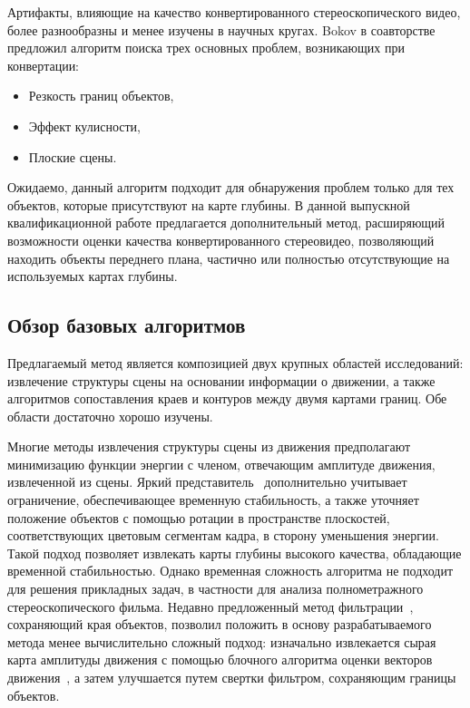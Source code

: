 \documentclass[14pt, a4paper]{extarticle}
\begin{document}
Артифакты, влияющие на качество конвертированного стереоскопического видео, более 
разнообразны и менее изучены в научных кругах. Bokov в соавторстве~\cite{bokov2014automatic} 
предложил алгоритм поиска трех основных проблем, возникающих при конвертации:
\begin{itemize}
	\item Резкость границ объектов,
	\item Эффект кулисности,
	\item Плоские сцены.
\end{itemize}
Ожидаемо, данный алгоритм подходит для обнаружения проблем только для тех объектов, 
которые присутствуют на карте глубины. В данной выпускной
квалификационной работе предлагается 
дополнительный метод, расширяющий возможности оценки качества конвертированного стереовидео,
позволяющий находить объекты переднего плана, частично или полностью отсутствующие
на используемых картах глубины.

\subsection{Обзор базовых алгоритмов}

Предлагаемый метод является композицией двух крупных областей исследований: извлечение структуры 
сцены на основании информации о движении, а также алгоритмов сопоставления краев и контуров 
между двумя картами границ. Обе области достаточно хорошо изучены.

Многие методы извлечения структуры сцены из движения предполагают минимизацию функции энергии
с членом, отвечающим амплитуде движения, извлеченной из сцены. Яркий 
представитель~\cite{zhang2009consistent} дополнительно учитывает ограничение, 
обеспечивающее временную стабильность, а также уточняет положение объектов с помощью ротации 
в пространстве плоскостей, соответствующих цветовым сегментам кадра, в сторону уменьшения энергии.
Такой подход позволяет извлекать карты глубины высокого качества, обладающие временной стабильностью.
Однако временная сложность алгоритма не подходит для решения прикладных задач, в частности 
для анализа полнометражного стереоскопического фильма. Недавно предложенный метод
фильтрации~\cite{he2013guided}, сохраняющий края объектов, позволил положить в основу разрабатываемого
метода менее вычислительно сложный подход: изначально извлекается сырая карта амплитуды движения 
с помощью блочного алгоритма оценки векторов движения~\cite{simonyan2008fast}, а затем улучшается
путем свертки фильтром, сохраняющим границы объектов.
\end{document}
